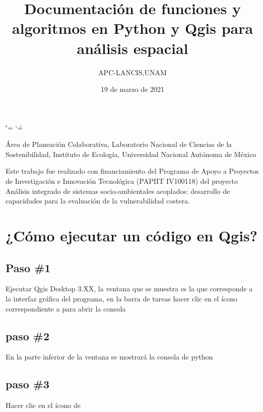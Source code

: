 \documentclass[letterpaper,10pt,spanish]{sphinxmanual}
\title{Documentación de funciones y algoritmos en Python y Qgis para análisis espacial}
\date{19 de marzo de 2021}
\author{APC-LANCIS,UNAM}
\begin{document}
\ifdefined\shorthandoff
  \ifnum\catcode`\=\string=\active\shorthandoff{=}\fi
  \ifnum\catcode`\"=\active{}\fi
\fi

\pagestyle{empty}
\sphinxmaketitle
\pagestyle{plain}
\sphinxtableofcontents
\pagestyle{normal}
\label{\detokenize{index::doc}}


Área de Planeación Colaborativa, Laboratorio Nacional de Ciencias de la Sostenibilidad, Instituto de Ecología, Universidad Nacional Autónoma de México


Este trabajo fue realizado con financiamiento del Programa de Apoyo a Proyectos de Investigación e Innovación Tecnológica (PAPIIT IV100118)
del proyecto Análisis integrado de sistemas socio-ambientales acoplados: desarrollo de capacidades para la evaluación de la vulnerabilidad costera.


\chapter{¿Cómo ejecutar un código en Qgis?}
\label{\detokenize{ejecucion:como-ejecutar-un-codigo-en-qgis}}\label{\detokenize{ejecucion::doc}}

\section{Paso \#1}
\label{\detokenize{ejecucion:paso-1}}
Ejecutar Qgis Desktop 3.XX, la ventana que se muestra es la que
corresponde a la interfaz gráfica del programa, en la barra de tareas
hacer clic en el ícono correspondiente a  para abrir la consola

\noindent{}


\section{paso \#2}
\label{\detokenize{ejecucion:paso-2}}
En la parte inferior de la ventana se mostrará la consola de python

\noindent{}


\section{paso \#3}
\label{\detokenize{ejecucion:paso-3}}
Hacer clic en el ícono de 
\end{document}
